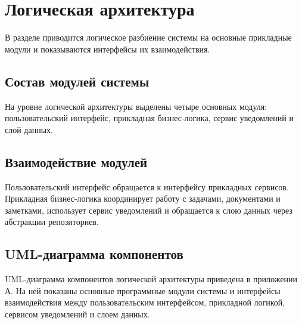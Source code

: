 \section{Логическая архитектура}
\headingtextsep

В разделе приводится логическое разбиение системы на основные прикладные модули и показываются интерфейсы их взаимодействия.

\textheadingsep
\subsection{Состав модулей системы}
\headingtextsep

На уровне логической архитектуры выделены четыре основных модуля: пользовательский интерфейс, прикладная бизнес-логика, сервис уведомлений и слой данных.

\textheadingsep
\subsection{Взаимодействие модулей}
\headingtextsep

Пользовательский интерфейс обращается к интерфейсу прикладных сервисов. Прикладная бизнес-логика координирует работу с задачами, документами и заметками, использует сервис уведомлений и обращается к слою данных через абстракции репозиториев.

\textheadingsep
\subsection{UML-диаграмма компонентов}
\headingtextsep

UML-диаграмма компонентов логической архитектуры приведена в приложении А. На ней показаны основные программные модули системы и интерфейсы взаимодействия между пользовательским интерфейсом, прикладной логикой, сервисом уведомлений и слоем данных.
